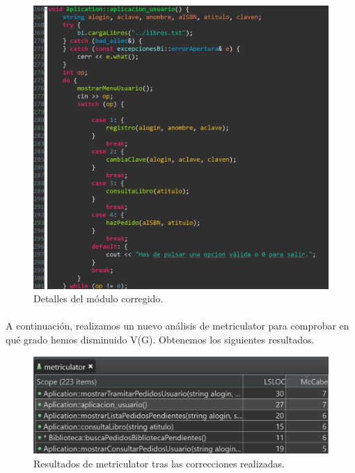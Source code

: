 		\begin{figure}[H]
			\centering
			\includegraphics[scale=0.9]{img/estebanFinal9.png}
			\caption{Detalles del módulo corregido.}
			\label{estebanFinal9}
		\end{figure}
		
		\paragraph{}A continuación, realizamos un nuevo análisis de metriculator para comprobar en qué grado hemos disminuido V(G). Obtenemos los siguientes resultados.
		
		\begin{figure}[H]
			\centering
			\includegraphics[scale=0.9]{img/estebanFinal10.png}
			\caption{Resultados de metriculator tras las correcciones realizadas.}
			\label{estebanFinal10}
		\end{figure}
		
